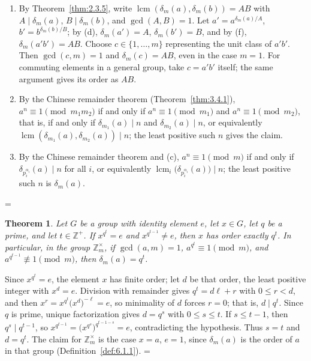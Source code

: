 \documentclass[11pt]{article}
\makeatletter
\let\nt@closedisplay\]
\def\nt@guardedclose{\@ifnextchar\par{\nt@closeafterpar}{\@ifnextchar\end{\postdisplaypenalty\@M\nt@closedisplay}{\nt@closedisplay}}}
\def\nt@closeafterpar\par{\@ifnextchar\par{\nt@closeafterpar}{\@ifnextchar\end{\postdisplaypenalty\@M\nt@closedisplay\par}{\nt@closedisplay\par}}}
\renewenvironment{proof}[1][\proofname]{\par
  \pushQED{\qed}\normalfont\topsep\medskipamount\edef\nt@afterproof{\@endparpenalty=\the\@endparpenalty\relax}\@beginparpenalty\@M\@endparpenalty\@M\let\]\nt@guardedclose\trivlist\item[]\textit{#1\@addpunct{.}} \ignorespaces}{\ifvmode\addpenalty\@M\fi\popQED\nt@afterproof\endtrivlist\@endpefalse}
\theoremstyle{ntstyle}
\newtheorem{theorem}{Theorem}[subsection]
\newcommand{\ZmodUnits}[1]{\mathbb{Z}_{#1}^{\times}}
\DeclareMathOperator{\lcm}{lcm}
\makeatother
\begin{document}
\begin{proof}
\begin{enumerate}[label={\alph*)}]
    $\delta_m(ab) = \delta_m(a)\delta_m(b)$. ($\Rightarrow$) If $\delta_m(ab) = \delta_m(a)\delta_m(b)$, then by
    the second divisibility relation in (e),
    $\delta_m(a)\delta_m(b)=\delta_m(ab)\mid L=\tfrac{\delta_m(a)\delta_m(b)}{G}$, forcing $G=1$.
    \item By Theorem~\ref{thm:2.3.5}, write $\lcm(\delta_m(a), \delta_m(b))=AB$ with $A\mid\delta_m(a)$,
          $B\mid\delta_m(b)$, and $\gcd(A, B)=1$.
          Let $a' = a^{\delta_m(a)/A}$, $b' = b^{\delta_m(b)/B}$; by (d),
          $\delta_m(a') = A$, $\delta_m(b') = B$, and by (f), $\delta_m(a'b') = AB$.
          Choose $c\in\{1,\ldots,m\}$ representing the unit class of $a'b'$.
          Then $\gcd(c,m)=1$ and $\delta_m(c)=AB$, even in the case $m=1$.
          For commuting elements in a general group, take $c=a'b'$ itself;
          the same argument gives its order as $AB$.
    \item By the Chinese remainder theorem (Theorem~\ref{thm:3.4.1}), $a^{n} \equiv 1 \pmod{m_1 m_2}$ if and only
    if $a^{n} \equiv 1 \pmod{m_1}$ and $a^n\equiv1\pmod{m_2}$, that is, if and only if $\delta_{m_1}(a) \mid n$ and
          $\delta_{m_2}(a) \mid n$, or equivalently $\lcm(\delta_{m_1}(a), \delta_{m_2}(a)) \mid n$; the least
          positive such $n$ gives the claim.
    \item By the Chinese remainder theorem and (c), $a^{n} \equiv 1 \pmod{m}$ if and only if
            $\delta_{p_i^{\alpha_i}}(a) \mid n$ for all $i$, or equivalently
            $\lcm_i\big(\delta_{p_i^{\alpha_i}}(a)\big) \mid n$; the
          least positive such $n$ is $\delta_m(a)$.\qedhere
\end{enumerate}
\end{proof}

\begin{theorem}\label{thm:6.1.2} Let $G$ be a
  group with identity element $e$, let $x\in G$, let $q$ be a prime, and let
  $t\in\mathbb{Z}^+$. If $x^{q^{t}}=e$ and $x^{q^{t-1}}\neq e$, then $x$ has
  order exactly $q^{t}$. In particular, in the group $\ZmodUnits{m}$, if
  $\gcd(a,m)=1$, $a^{q^{t}}\equiv1\pmod{m}$, and
  $a^{q^{t-1}}\not\equiv1\pmod{m}$, then $\delta_m(a)=q^{t}$.

\end{theorem}

\begin{proof} Since $x^{q^{t}}=e$, the element $x$ has finite
  order; let $d$ be that order, the least positive integer with $x^{d}=e$.
  Division with remainder gives $q^{t}=d\ell+r$ with $0\le r<d$, and then
  $x^{r}=x^{q^{t}}\big(x^{d}\big)^{-\ell}=e$, so minimality of $d$ forces $r=0$;
  that is, $d\mid q^{t}$. Since $q$ is prime, unique factorization gives
  $d=q^{s}$ with $0\le s\le t$. If $s\le t-1$, then $q^{s}\mid q^{t-1}$, so
  $x^{q^{t-1}}=\big(x^{q^{s}}\big)^{q^{t-1-s}}=e$, contradicting the hypothesis.
  Thus $s=t$ and $d=q^{t}$. The claim for $\ZmodUnits{m}$ is
  the case $x=a$, $e=1$, since $\delta_m(a)$ is the order of
  $a$ in that group (Definition~\ref{def:6.1.1}).
\end{proof}
\end{document}
